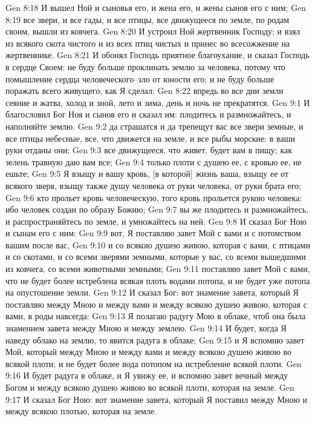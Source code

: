 Gen 8:18  И вышел Ной и сыновья его, и жена его, и жены сынов его с ним;
Gen 8:19  все звери, и все гады, и все птицы, все движущееся по земле, по родам своим, вышли из ковчега.
Gen 8:20  И устроил Ной жертвенник Господу; и взял из всякого скота чистого и из всех птиц чистых и принес во всесожжение на жертвеннике.
Gen 8:21  И обонял Господь приятное благоухание, и сказал Господь в сердце Своем: не буду больше проклинать землю за человека, потому что помышление сердца человеческого--зло от юности его; и не буду больше поражать всего живущего, как Я сделал:
Gen 8:22  впредь во все дни земли сеяние и жатва, холод и зной, лето и зима, день и ночь не прекратятся.
Gen 9:1  И благословил Бог Ноя и сынов его и сказал им: плодитесь и размножайтесь, и наполняйте землю.
Gen 9:2  да страшатся и да трепещут вас все звери земные, и все птицы небесные, все, что движется на земле, и все рыбы морские: в ваши руки отданы они;
Gen 9:3  все движущееся, что живет, будет вам в пищу; как зелень травную даю вам все;
Gen 9:4  только плоти с душею ее, с кровью ее, не ешьте;
Gen 9:5  Я взыщу и вашу кровь, [в которой] жизнь ваша, взыщу ее от всякого зверя, взыщу также душу человека от руки человека, от руки брата его;
Gen 9:6  кто прольет кровь человеческую, того кровь прольется рукою человека: ибо человек создан по образу Божию;
Gen 9:7  вы же плодитесь и размножайтесь, и распространяйтесь по земле, и умножайтесь на ней.
Gen 9:8  И сказал Бог Ною и сынам его с ним:
Gen 9:9  вот, Я поставляю завет Мой с вами и с потомством вашим после вас,
Gen 9:10  и со всякою душею живою, которая с вами, с птицами и со скотами, и со всеми зверями земными, которые у вас, со всеми вышедшими из ковчега, со всеми животными земными;
Gen 9:11  поставляю завет Мой с вами, что не будет более истреблена всякая плоть водами потопа, и не будет уже потопа на опустошение земли.
Gen 9:12  И сказал Бог: вот знамение завета, который Я поставляю между Мною и между вами и между всякою душею живою, которая с вами, в роды навсегда:
Gen 9:13  Я полагаю радугу Мою в облаке, чтоб она была знамением завета между Мною и между землею.
Gen 9:14  И будет, когда Я наведу облако на землю, то явится радуга в облаке;
Gen 9:15  и Я вспомню завет Мой, который между Мною и между вами и между всякою душею живою во всякой плоти; и не будет более вода потопом на истребление всякой плоти.
Gen 9:16  И будет радуга в облаке, и Я увижу ее, и вспомню завет вечный между Богом и между всякою душею живою во всякой плоти, которая на земле.
Gen 9:17  И сказал Бог Ною: вот знамение завета, который Я поставил между Мною и между всякою плотью, которая на земле.
